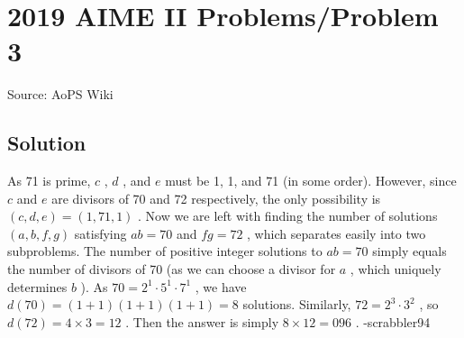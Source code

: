 \documentclass[12pt]{article}
\begin{document}
\section*{{2019 AIME II Problems/Problem 3}}
Source: AoPS Wiki

\subsection*{Solution}
As 71 is prime, $c$ , $d$ , and $e$ must be 1, 1, and 71 (in some order). However, since $c$ and $e$ are divisors of 70 and 72 respectively, the only possibility is $(c,d,e) = (1,71,1)$ . Now we are left with finding the number of solutions $(a,b,f,g)$ satisfying $ab = 70$ and $fg = 72$ , which separates easily into two subproblems. The number of positive integer solutions to $ab = 70$ simply equals the number of divisors of 70 (as we can choose a divisor for $a$ , which uniquely determines $b$ ). As $70 = 2^1 \cdot 5^1 \cdot 7^1$ , we have $d(70) = (1+1)(1+1)(1+1) = 8$ solutions. Similarly, $72 = 2^3 \cdot 3^2$ , so $d(72) = 4 \times 3 = 12$ . Then the answer is simply $8 \times 12 = \boxed{096}$ . -scrabbler94
\end{document}
